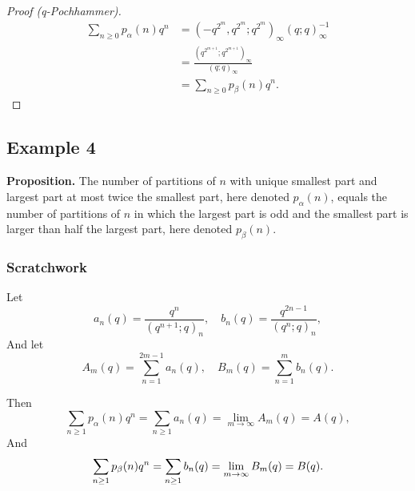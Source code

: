 \begin{proof}[Proof (q-Pochhammer)]
  \begin{align*}
      \sum_{n\ge 0}p_\alpha(n)q^n &= (-q^{2^m},q^{2^m};q^{2^m})_\infty (q;q)_\infty^{-1} \\
      &= \frac{(q^{2^{m+1}};q^{2^{m+1}})_\infty}{(q;q)_\infty} \\[0.75em]
      &= \sum_{n\ge 0} p_\beta(n)q^n.
  \end{align*}
\end{proof}

\newpage

\subsection*{Example 4}\label{subsec:example-4}

\textbf{Proposition.}
The number of partitions of $n$
with unique smallest part and largest part at most twice the smallest part,
here denoted $p_\alpha(n)$,
equals
the number of partitions of $n$
in which the largest part is odd and the smallest part is larger than half the largest part,
here denoted $p_\beta(n)$.

\subsubsection*{Scratchwork}

Let
\begin{equation}
    a_n(q)=\frac{q^n}{(q^{n+1};q)_n}
    ,\quad
    b_n(q)=\frac{q^{2n-1}}{(q^n;q)_n}
    ,
\end{equation}
And let
\begin{equation}
    A_m(q) = \sum_{n=1}^{2m-1}a_n(q)
    ,\quad
    B_m(q) = \sum_{n=1}^{m}b_n(q)
    .
\end{equation}

Then
\begin{equation}
    \sum_{n\ge 1} p_\alpha(n)q^n = \sum_{n\ge 1} a_n(q) = \lim_{m\to\infty}A_m(q) = A(q),
\end{equation}
And
\begin{equation}
    \sum_{n\ge 1} p_\beta(n)q^n = \sum_{n\ge 1} b_n(q) = \lim_{m\to\infty}B_m(q) = B(q).\\[1em]
\end{equation}

